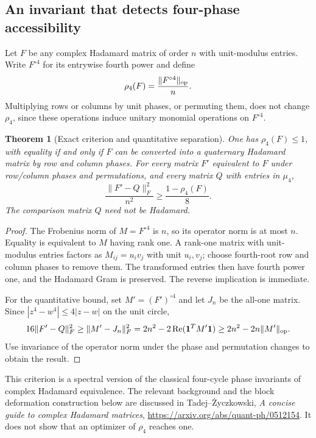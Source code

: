 \documentclass[11pt]{article}
\newtheorem{theorem}{Theorem}[section]
\begin{document}
\subsection{An invariant that detects four-phase accessibility}
Let $F$ be any complex Hadamard matrix of order $n$ with unit-modulus
entries. Write $F^{\circ4}$ for its entrywise fourth power and define
\[
                 \rho_4(F)=\frac{\|F^{\circ4}\|_{\rm op}}n.
\]
Multiplying rows or columns by unit phases, or permuting them, does
not change $\rho_4$, since these operations induce unitary monomial
operations on $F^{\circ4}$.

\begin{theorem}[Exact criterion and quantitative separation]
\label{quat:phase-defect}
One has $\rho_4(F)\le1$, with equality if and only if $F$ can be
converted into a quaternary Hadamard matrix by row and column phases.
For every matrix $F'$ equivalent to $F$ under row/column phases and
permutations, and every matrix $Q$ with entries in $\mu_4$,
\[
              \frac{\|F'-Q\|_F^2}{n^2}
                    \ge\frac{1-\rho_4(F)}8.
\]
The comparison matrix $Q$ need not be Hadamard.
\end{theorem}
\begin{proof}
The Frobenius norm of $M=F^{\circ4}$ is $n$, so its operator norm
is at most $n$. Equality is equivalent to $M$ having rank one.
A rank-one matrix with unit-modulus entries factors as $M_{ij}=u_i v_j$
with unit $u_i,v_j$; choose fourth-root row and column phases to
remove them. The transformed entries then have fourth power one,
and the Hadamard Gram is preserved. The reverse implication is immediate.

For the quantitative bound, set $M'=(F')^{\circ4}$ and let $J_n$
be the all-one matrix. Since $|z^4-w^4|\le4|z-w|$ on the unit circle,
\[
 16\|F'-Q\|_F^2\ge\|M'-J_n\|_F^2
 =2n^2-2\operatorname{Re}(\mathbf1^TM'\mathbf1)
 \ge2n^2-2n\|M'\|_{\rm op}.
\]
Use invariance of the operator norm under the phase and permutation
changes to obtain the result.
\end{proof}

This criterion is a spectral version of the classical four-cycle
phase invariants of complex Hadamard equivalence. The relevant
background and the block deformation construction below are discussed
in Tadej--\.Zyczkowski, \emph{A concise guide to complex Hadamard matrices},
\url{https://arxiv.org/abs/quant-ph/0512154}.
It does not show that an optimizer of $\rho_4$ reaches one.
\end{document}
